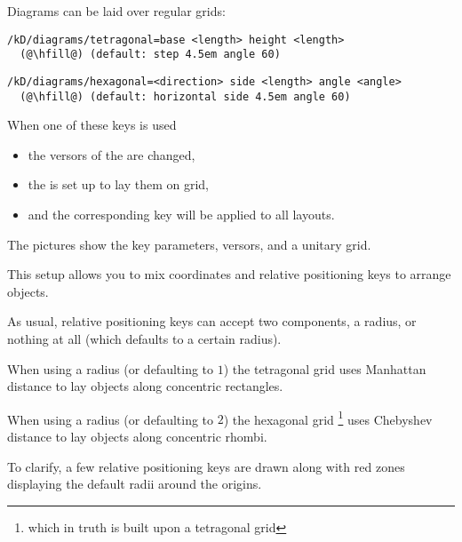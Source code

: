 \begin{marginfigure}[0cm]
\begin{subfigure}{\linewidth}
    \bigskip
  \end{subfigure}
\end{marginfigure}

Diagrams can be laid over regular grids:

\begin{lstlisting}
/kD/diagrams/tetragonal=base <length> height <length>
  (@\hfill@) (default: step 4.5em angle 60)
\end{lstlisting}

\begin{lstlisting}
/kD/diagrams/hexagonal=<direction> side <length> angle <angle>
  (@\hfill@) (default: horizontal side 4.5em angle 60)
\end{lstlisting}

When one of these keys is used
\begin{itemize}[noitemsep]
  \item the versors of the  are changed,
  \item the  is set up to lay them on grid,
  \item and the corresponding key will be applied to all layouts.
\end{itemize}

The pictures show the key parameters, versors, and a unitary grid.

This setup allows you to mix coordinates and
relative positioning keys to arrange objects.

As usual, relative positioning keys can accept two components, a radius,
or nothing at all (which defaults to a certain radius).

When using a radius (or defaulting to $1$)
the tetragonal grid uses Manhattan distance to
lay objects along concentric rectangles.

When using a radius (or defaulting to $2$)
the hexagonal grid%
\footnote{which in truth is built upon a tetragonal grid}
uses Chebyshev distance to
lay objects along concentric rhombi.

To clarify, a few relative positioning keys are drawn along
with red zones displaying the default radii around the origins.
